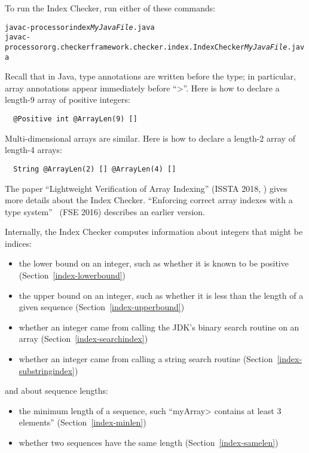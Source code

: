 To run the Index Checker, run either of these commands:

\begin{alltt}
  javac -processor index \emph{MyJavaFile}.java
  javac -processor org.checkerframework.checker.index.IndexChecker \emph{MyJavaFile}.java
\end{alltt}

Recall that in Java, type annotations are written before the type;
in particular,
array annotations appear immediately before ``\<[]>''.
Here is how to declare a length-9 array of positive integers:

\begin{Verbatim}
  @Positive int @ArrayLen(9) []
\end{Verbatim}

Multi-dimensional arrays are similar.
Here is how to declare a length-2 array of length-4 arrays:

\begin{Verbatim}
  String @ArrayLen(2) [] @ArrayLen(4) []
\end{Verbatim}

The paper ``Lightweight Verification of Array Indexing'' (ISSTA 2018,
)
gives more details about the Index Checker.
``Enforcing correct array indexes with a type system''~\cite{Santino2016} (FSE 2016) describes
an earlier version.



Internally, the Index Checker computes information about integers that
might be indices:
\begin{itemize}
\item
  the lower bound on an integer, such as whether it is known to be positive
  (Section~\ref{index-lowerbound})
\item
  the upper bound on an integer, such as whether it is less than the length
  of a given sequence (Section~\ref{index-upperbound})
\item
  whether an integer came from calling the JDK's binary search routine on
  an array (Section~\ref{index-searchindex})
\item
  whether an integer came from calling a string search routine
  (Section~\ref{index-substringindex})
\end{itemize}

\noindent
and about sequence lengths:
\begin{itemize}
\item
  the minimum length of a sequence, such ``\<myArray> contains at least 3
  elements'' (Section~\ref{index-minlen})
\item
  whether two sequences have the same length (Section~\ref{index-samelen})
\end{itemize}

